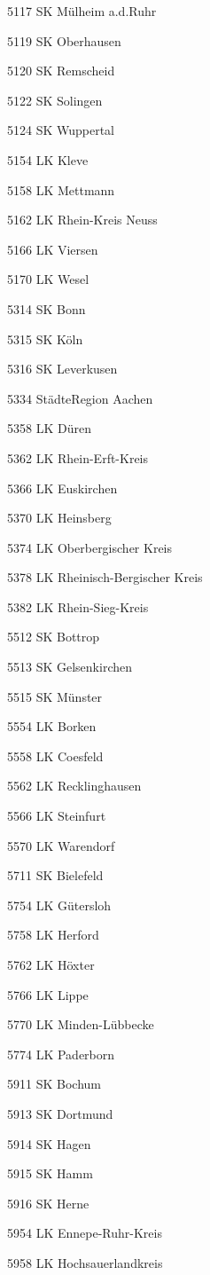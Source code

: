 5117  SK Mülheim a.d.Ruhr

5119  SK Oberhausen

5120  SK Remscheid

5122  SK Solingen

5124  SK Wuppertal

5154  LK Kleve

5158  LK Mettmann

5162  LK Rhein-Kreis Neuss

5166  LK Viersen

5170  LK Wesel

5314  SK Bonn

5315  SK Köln

5316  SK Leverkusen

5334  StädteRegion Aachen

5358  LK Düren

5362  LK Rhein-Erft-Kreis

5366  LK Euskirchen

5370  LK Heinsberg

5374  LK Oberbergischer Kreis

5378  LK Rheinisch-Bergischer Kreis

5382  LK Rhein-Sieg-Kreis

5512  SK Bottrop

5513  SK Gelsenkirchen

5515  SK Münster

5554  LK Borken

5558  LK Coesfeld

5562  LK Recklinghausen

5566  LK Steinfurt

5570  LK Warendorf

5711  SK Bielefeld

5754  LK Gütersloh

5758  LK Herford

5762  LK Höxter

5766  LK Lippe

5770  LK Minden-Lübbecke

5774  LK Paderborn

5911  SK Bochum

5913  SK Dortmund

5914  SK Hagen

5915  SK Hamm

5916  SK Herne

5954  LK Ennepe-Ruhr-Kreis

5958  LK Hochsauerlandkreis

